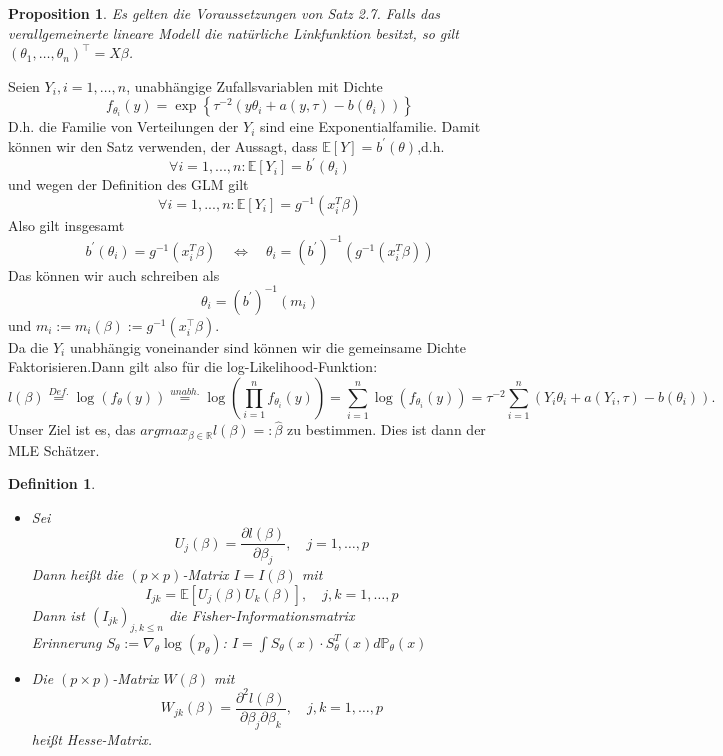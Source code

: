 \documentclass[a4paper,oneside,bibliography=totoc]{scrartcl}
\newtheorem{defn}{Definition}[section] %
\newtheorem{prop}{Proposition}[section]
\begin{document}
\begin{prop}
     Es gelten die Voraussetzungen von Satz 2.7. Falls das verallgemeinerte lineare Modell die natürliche Linkfunktion besitzt, so gilt $\left(\theta_1, \ldots, \theta_n\right)^{\top}=X \beta$.
\end{prop}

Seien $Y_i, i=1, \ldots, n$, unabhängige Zufallsvariablen mit Dichte
$$
f_{\theta_{i}}(y)=\exp \left\{\tau^{-2}\left(y \theta_i+a(y, \tau)-b\left(\theta_i\right)\right)\right\}
$$
D.h. die Familie von Verteilungen der $Y_{i}$ sind eine Exponentialfamilie. Damit können wir den Satz verwenden, der Aussagt, dass $\mathbb{E}[Y]=b^{\prime}(\theta)$,d.h.
$$
\forall i=1,...,n: \mathbb{E}[Y_{i}]=b^{\prime}(\theta_{i})
$$
und wegen der Definition des GLM gilt
$$
\forall i=1,...,n: \mathbb{E}[Y_{i}]=g^{-1}(x_{i}^{T}\beta)
$$
Also gilt insgesamt
$$
b^{\prime}(\theta_{i})=g^{-1}(x_{i}^{T}\beta) \quad \iff \quad \theta_{i}=(b^{\prime})^{-1}\left(g^{-1}(x_{i}^{T}\beta)\right)
$$
Das können wir auch schreiben als
$$
\theta_i=\left(b^{\prime}\right)^{-1}\left(m_i\right)
$$
und $m_i:=m_i(\beta):=g^{-1}\left(x_i^{\top} \beta\right)$. \\
Da die $Y_{i}$ unabhängig voneinander sind können wir die gemeinsame Dichte Faktorisieren.Dann gilt also für die log-Likelihood-Funktion:
$$
l(\beta)\stackrel{Def.}{=}\log(f_{\theta}(y))\stackrel{unabh.}{=}\log(\prod_{i=1}^{n} f_{\theta_{i}}(y))=\sum_{i=1}^{n}\log(f_{\theta_{i}}(y))=\tau^{-2} \sum_{i=1}^n\left(Y_i \theta_i+a\left(Y_i, \tau\right)-b\left(\theta_i\right)\right) .
$$
Unser Ziel ist es, das $argmax_{\beta \in \mathbb{R}}l(\beta)=:\hat{\beta}$ zu bestimmen. Dies ist dann der MLE Schätzer.

\begin{defn} \text{ }
\begin{itemize}
    \item [1.] Sei
$$
U_j(\beta)=\frac{\partial l(\beta)}{\partial \beta_j}, \quad j=1, \ldots, p
$$
Dann heißt die $(p \times p)$-Matrix $I=I(\beta)$ mit
$$
I_{j k}=\mathbb{E} [U_j(\beta) U_k(\beta)], \quad j, k=1, \ldots, p
$$
Dann ist $(I_{jk})_{j,k \leq n}$ die Fisher-Informationsmatrix\\
Erinnerung $S_{\theta}:=\nabla_{\theta} \log(p_{\theta})$: $I=\int S_{\theta}(x)\cdot S_{\theta}^{T}(x) d\mathbb{P}_{\theta}(x)$
\item [2.] Die $(p \times p)$-Matrix $W(\beta)$ mit
$$
W_{j k}(\beta)=\frac{\partial^2 l(\beta)}{\partial \beta_j \partial \beta_k}, \quad j, k=1, \ldots, p
$$
heißt Hesse-Matrix.
\end{itemize}
\end{defn}
\end{document}
